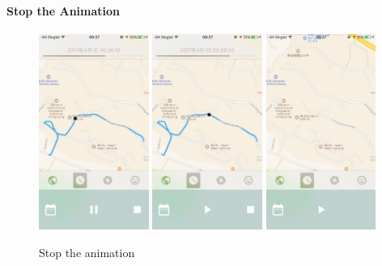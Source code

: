 \documentclass[12pt,a4paper]{article}
\begin{document}
                \paragraph{Stop the Animation}
                \begin{figure}[H]
                    \includegraphics[width=0.32\textwidth]{2-4-2-3-a}
                    \includegraphics[width=0.32\textwidth]{2-4-2-3-b}
                    \includegraphics[width=0.32\textwidth]{2-4-2-3-c}
                    \centering
                    \caption{Stop the animation}
                    \label{fig:stop-animation}
                \end{figure}
                
\end{document}
